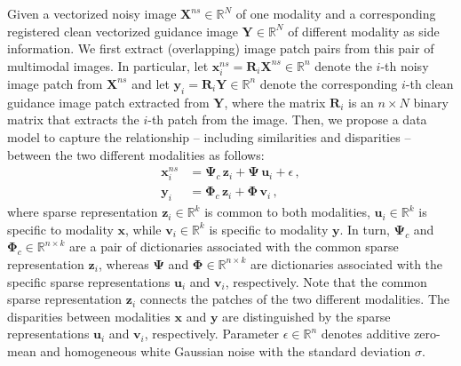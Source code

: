 \documentclass{article}
\begin{document}
Given a vectorized noisy image $\mathbf{X}^{ns} \in \mathbb{R}^{N}$ of one modality and a corresponding registered clean vectorized guidance image $\mathbf{Y} \in \mathbb{R}^{N}$ of different modality as side information. We first extract (overlapping) image patch pairs from this pair of multimodal images. In particular, let $\mathbf{x}^{ns}_{i} = \mathbf{R}_i \mathbf{X}^{ns} \in \mathbb{R}^{n}$ denote the $i$-th noisy image patch from $\mathbf{X}^{ns}$ and let $\mathbf{y}_{i} = \mathbf{R}_i \mathbf{Y} \in \mathbb{R}^{n}$ denote the corresponding $i$-th clean guidance image patch extracted from $\mathbf{Y}$, where the matrix $\mathbf{R}_i$ is an $n \times N$ binary matrix that extracts the $i$-th patch from the image. Then, we propose a data model to capture the relationship -- including similarities and disparities -- between the two different modalities as follows:
\begin{align}
\mathbf{x}^{ns}_i 
&= 
\boldsymbol{\Psi}_{c} \, \mathbf{z}_i + \boldsymbol{\Psi} \, \mathbf{u}_i + \epsilon \,,
\label{Eq:SparseModelX_Noise}
\\
\mathbf{y}_i
&= 
\boldsymbol{\Phi}_{c} \, \mathbf{z}_i + \boldsymbol{\Phi} \, \mathbf{v}_i \,,
\label{Eq:SparseModelY_Noise}
\end{align}
where sparse representation $\mathbf{z}_i \in \mathbb{R}^{k}$ is common to both modalities, $\mathbf{u}_i \in \mathbb{R}^{k}$ is specific to modality $\mathbf{x}$, while $\mathbf{v}_i \in \mathbb{R}^{k}$ is specific to modality $\mathbf{y}$. In turn, $\boldsymbol{\Psi}_{c} $ and $\boldsymbol{\Phi}_{c} \in \mathbb{R}^{n \times k}$ are a pair of dictionaries associated with the common sparse representation $\mathbf{z}_i$, whereas $\boldsymbol{\Psi}$ and $\boldsymbol{\Phi} \in \mathbb{R}^{n \times k}$ are dictionaries associated with the specific sparse representations $\mathbf{u}_i$ and $\mathbf{v}_i$, respectively. 
Note that the common sparse representation $\mathbf{z}_i$ connects the patches of the two different modalities. The disparities between modalities $\mathbf{x}$ and $\mathbf{y}$ are distinguished by the sparse representations $\mathbf{u}_i$ and $\mathbf{v}_i$, respectively. 
%
Parameter $\epsilon \in \mathbb{R}^n$ denotes additive zero-mean and homogeneous white Gaussian noise with the standard deviation $\sigma$.
\end{document}
